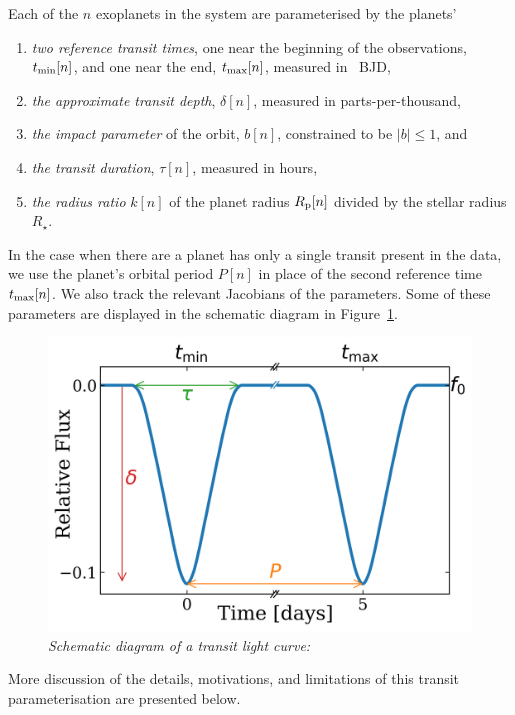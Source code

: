 \documentclass[linenumbers,floatfix,ApJL,twocolumn]{aastex631}
\begin{document}
Each of the $n$ exoplanets in the system are parameterised by the planets'
\begin{enumerate}
  \item \emph{two reference transit times}, one near the beginning of the observations, $t_{\rm min}[n]$, and one near the end, $t_{\rm max}[n]$, measured in \tess\ BJD,
  \item \emph{the approximate transit depth}, $\delta[n]$, measured in parts-per-thousand,
  \item \emph{the impact parameter} of the orbit, $b[n]$, constrained to be $|b| \le 1$, and
  \item \emph{the transit duration}, $\tau[n]$, measured in hours,
  \item \emph{the radius ratio} $k[n]$ of the planet radius $R_{\rm p}[n]$ divided by the stellar radius $R_\star$.
\end{enumerate}
In the case when there are a planet has only a single transit present in the data, we use the planet's orbital period $P[n]$ in place of the second reference time $t_{\rm max}[n]$.
We also track the relevant Jacobians of the parameters. Some of these parameters are displayed in the schematic diagram in Figure~\ref{fig:schematic-transit-plot}.

\begin{figure}
  \includegraphics[width=\linewidth]{figures/transit_model.png}
  \caption{\textit{Schematic diagram of a transit light curve:} }
  \label{fig:schematic-transit-plot}
\end{figure}

More discussion of the details, motivations, and limitations of this transit parameterisation are presented below.
\end{document}
